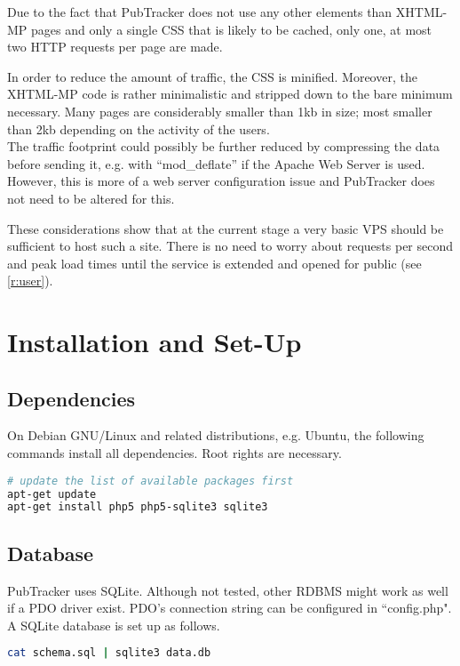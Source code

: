 \documentclass[a4paper,10pt]{scrartcl}
\begin{document}
Due to the fact that PubTracker does not use any other elements than
\ac{XHTML-MP} pages and only a single \ac{CSS} that is likely to be cached, only
one, at most two \ac{HTTP} requests per page are made.

In order to reduce the amount of traffic, the \ac{CSS} is minified. Moreover,
the \ac{XHTML-MP} code is rather minimalistic and stripped down to the bare
minimum necessary. Many pages are considerably smaller than 1kb in size; most
smaller than 2kb depending on the activity of the users.\\
The traffic footprint
could possibly be further reduced by compressing the data before sending it, e.g. with ``mod\_deflate'' if the Apache Web Server
is used. However, this is more of a web server configuration issue and PubTracker does
not need to be altered for this.

These considerations show that at the current stage a very basic \ac{VPS}
should be sufficient to host such a site. There is no need to worry about
requests per second and peak load times until the service is extended and
opened for public (see \ref{r:user}).

\section{Installation and Set-Up}
\subsection{Dependencies}
On Debian GNU/Linux and related distributions, e.g. Ubuntu, the following
commands install all dependencies. Root rights are necessary.
\begin{lstlisting}[language=bash]
# update the list of available packages first
apt-get update
apt-get install php5 php5-sqlite3 sqlite3
\end{lstlisting}

\subsection{Database}
PubTracker uses SQLite. Although not tested, other \acs{RDBMS} might work as
well if a \ac{PDO} driver exist. \ac{PDO}'s connection string can be configured in
``config.php". A SQLite database is set up as follows.

\begin{lstlisting}[language=bash]
cat schema.sql | sqlite3 data.db
\end{lstlisting}
\end{document}
